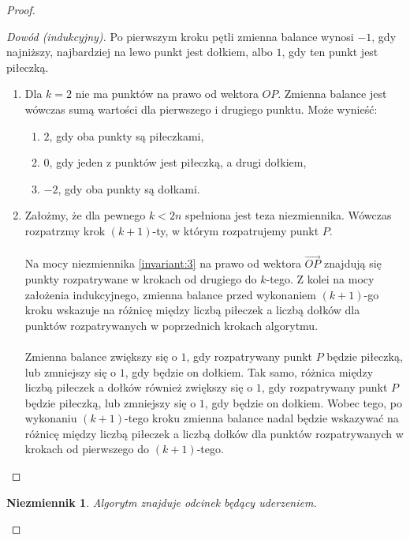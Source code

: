 \documentclass[10pt,a4paper]{article}
\newtheorem{invariant}{Niezmiennik}
\begin{document}
\begin{proof}
		\begin{proof}[Dowód (indukcyjny)]
			Po pierwszym kroku pętli zmienna balance wynosi $-1$, gdy najniższy, najbardziej na lewo punkt jest dołkiem, albo $1$, gdy ten punkt jest piłeczką. 
			\begin{enumerate}
				\item Dla $k = 2$ nie ma punktów na prawo od wektora $OP$. Zmienna balance jest wówczas sumą wartości dla pierwszego i drugiego punktu. Może wynieść:
				\begin{enumerate}
					\item $2$, gdy oba punkty są piłeczkami,
					\item $0$, gdy jeden z punktów jest piłeczką, a drugi dołkiem,
					\item $-2$, gdy oba punkty są dołkami.
				\end{enumerate}
				\item Założmy, że dla pewnego $k < 2n$ spełniona jest teza niezmiennika. Wówczas rozpatrzmy krok $(k+1)$-ty, w którym rozpatrujemy punkt $P$. \\~\\
				Na mocy niezmiennika \ref{invariant:3} na prawo od wektora $\overrightarrow{OP}$ znajdują się punkty rozpatrywane w krokach od drugiego do $k$-tego. Z kolei na mocy założenia indukcyjnego, zmienna balance przed wykonaniem $(k+1)$-go kroku wskazuje na różnicę między liczbą piłeczek a liczbą dołków dla punktów rozpatrywanych w poprzednich krokach algorytmu. \\~\\
				Zmienna balance zwiększy się o $1$, gdy rozpatrywany punkt $P$ będzie piłeczką, lub zmniejszy się o $1$, gdy będzie on dołkiem. Tak samo, różnica między liczbą piłeczek a dołków również zwiększy się o $1$, gdy rozpatrywany punkt $P$ będzie piłeczką, lub zmniejszy się o $1$, gdy będzie on dołkiem. Wobec tego, po wykonaniu $(k+1)$-tego kroku zmienna balance nadal będzie wskazywać na różnicę między liczbą piłeczek a liczbą dołków dla punktów rozpatrywanych w krokach od pierwszego do $(k+1)$-tego. 
			\end{enumerate}
			
		\end{proof}
	
		\begin{invariant}
			Algorytm znajduje odcinek będący uderzeniem.
		\end{invariant}
	

\end{proof}
\end{document}
